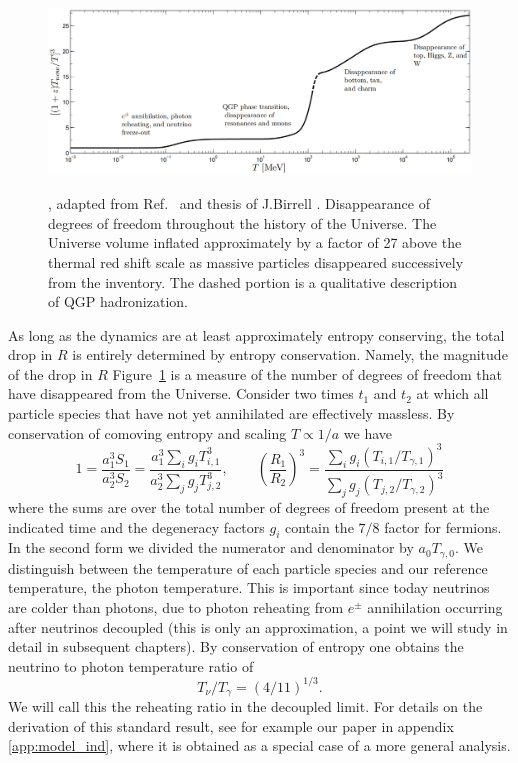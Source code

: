 \begin{figure} 
\centerline{\includegraphics[height=5.2cm]{01-introduction/Figures/degrees_of_freedom.PNG}}
\caption{, adapted from Ref.~\cite{Rafelski:2013yka}  and thesis of J.Birrell \cite{Birrell:2014ona}. Disappearance of degrees of freedom throughout the history of the Universe. The Universe volume inflated approximately by a factor of 27 above the thermal red shift scale as massive particles disappeared successively from the inventory.  The dashed portion is a qualitative description
of QGP hadronization.\label{fig:dof}}
 \end{figure}



As long as the dynamics are at least approximately entropy conserving, the total drop in $R$ is entirely determined by entropy conservation. Namely, the magnitude of the drop in $R$ Figure~\ref{fig:dof} is a measure of the number of degrees of freedom that have disappeared from the Universe. Consider two times $t_1$ and $t_2$ at which all particle species that have not yet annihilated are effectively massless. By conservation of comoving entropy and scaling $T\propto 1/a$ we have
\begin{equation}\label{r_ratio}
1=\frac{a_1^3S_{1}}{a_2^3 S_2}=\frac{a_1^3\sum_ig_i T_{i,1}^3}{a_2^3\sum_j g_j T_{j,2}^3},\qquad \left(\frac{R_1}{R_2}\right)^3=\frac{\sum_ig_i (T_{i,1}/T_{\gamma,1})^3}{\sum_j g_j (T_{j,2}/T_{\gamma,2})^3}
\end{equation}
where the sums are over the total number of degrees of freedom present at the indicated time and the degeneracy factors $g_i$ contain the $7/8$ factor for fermions. In the second form we divided the numerator and denominator by $a_{0}T_{\gamma,0}$. We distinguish between the temperature of each particle species and our reference temperature, the photon temperature. This is important since today neutrinos are colder than photons, due to photon reheating from $e^\pm$ annihilation occurring after neutrinos decoupled (this is only an approximation, a point we will study in detail in subsequent chapters). By conservation of entropy one obtains the neutrino to photon temperature ratio of
\begin{equation}\label{T_nu_T_gamma}
T_\nu/T_\gamma=({4}/{11})^{1/3}.
\end{equation}
We will call this the reheating ratio in the decoupled limit. For details on the derivation of this standard result, see for example our paper in appendix \ref{app:model_ind}, where it is obtained as a special case of a more general analysis. 

